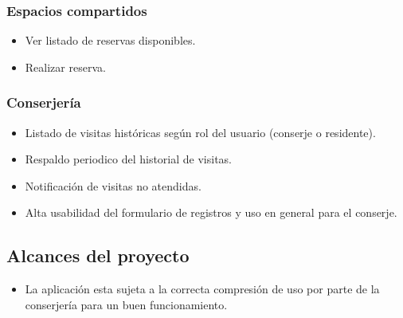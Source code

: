 \subsubsection{Espacios compartidos}
\begin{itemize}
	\item Ver listado de reservas disponibles.
	\item Realizar reserva.
\end{itemize}
\subsubsection{Conserjería}
\begin{itemize}
	\item Listado de visitas históricas según rol del usuario (conserje o residente).
	\item Respaldo periodico del historial de visitas.
	\item Notificación de visitas no atendidas.
	\item Alta usabilidad del formulario de registros y uso en general para el conserje.	
\end{itemize}

\subsection{Alcances del proyecto}
\begin{itemize}
	\item La aplicación esta sujeta a la correcta compresión de uso por parte de la conserjería para un buen funcionamiento.
\end{itemize}

